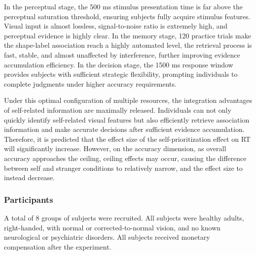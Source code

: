 \documentclass[
  english,
  man,floatsintext]{apa6}
\begin{document}
In the perceptual stage, the 500 ms stimulus presentation time is far above the perceptual saturation threshold, ensuring subjects fully acquire stimulus features. Visual input is almost lossless, signal-to-noise ratio is extremely high, and perceptual evidence is highly clear. In the memory stage, 120 practice trials make the shape-label association reach a highly automated level, the retrieval process is fast, stable, and almost unaffected by interference, further improving evidence accumulation efficiency. In the decision stage, the 1500 ms response window provides subjects with sufficient strategic flexibility, prompting individuals to complete judgments under higher accuracy requirements.

Under this optimal configuration of multiple resources, the integration advantages of self-related information are maximally released. Individuals can not only quickly identify self-related visual features but also efficiently retrieve association information and make accurate decisions after sufficient evidence accumulation. Therefore, it is predicted that the effect size of the self-prioritization effect on RT will significantly increase. However, on the accuracy dimension, as overall accuracy approaches the ceiling, ceiling effects may occur, causing the difference between self and stranger conditions to relatively narrow, and the effect size to instead decrease.

\subsubsection{Participants}\label{participants}

A total of 8 groups of subjects were recruited. All subjects were healthy adults, right-handed, with normal or corrected-to-normal vision, and no known neurological or psychiatric disorders. All subjects received monetary compensation after the experiment.
\end{document}
